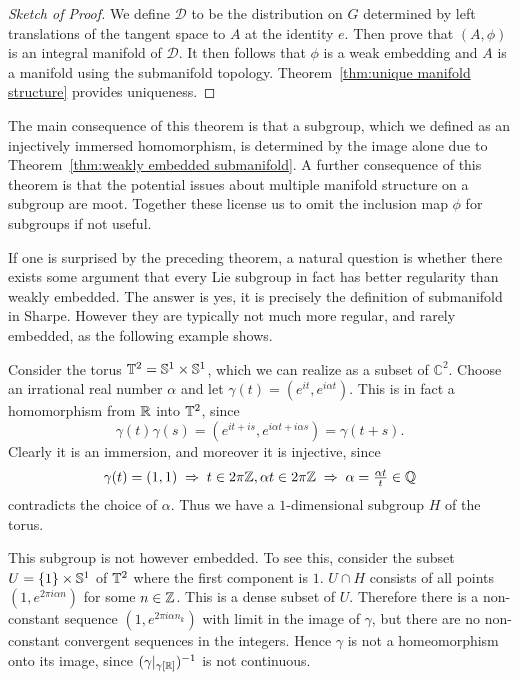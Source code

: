 \begin{proof}[Sketch of Proof]
We define $\mathcal{D}$ to be the distribution on $G$ determined by left translations of the tangent space to $A$ at the identity $e$. 
Then prove that $(A,\phi)$ is an integral manifold of $\mathcal{D}$. 
It then follows that $\phi$ is a weak embedding and $A$ is a manifold using the submanifold topology.
Theorem~\ref{thm:unique manifold structure} provides uniqueness.
\end{proof}

The main consequence of this theorem is that a subgroup, which we defined as an injectively immersed homomorphism, is determined by the image alone due to Theorem~\ref{thm:weakly embedded submanifold}.
A further consequence of this theorem is that the potential issues about multiple manifold structure on a subgroup are moot.
Together these license us to omit the inclusion map $\phi$ for subgroups if not useful.

If one is surprised by the preceding theorem, a natural question is whether there exists some argument that every Lie subgroup in fact has better regularity than weakly embedded.
The answer is yes, it is precisely the definition of submanifold in Sharpe.
However they are typically not much more regular, and rarely embedded, as the following example shows.

\begin{example}
\label{eg:dense subgroup in torus}
Consider the torus $\mathbb{T}^2 = \mathbb{S}^1 \times \mathbb{S}^1$, which we can realize as a subset of $\mathbb{C}^2$.
Choose an irrational real number $\alpha$ and let $\gamma(t) = (e^{it}, e^{i\alpha t})$.
This is in fact a homomorphism from $\mathbb{R}$ into $\mathbb{T}^2$, since
\[
\gamma(t)\gamma(s)
= (e^{it+is}, e^{i\alpha t+i\alpha s})
= \gamma(t+s).
\]
Clearly it is an immersion, and moreover it is injective, since
\[
\gamma(t) = (1,1)
\;\Rightarrow\;
t \in 2\pi\mathbb{Z}, \alpha t \in 2\pi\mathbb{Z}
\;\Rightarrow\;
\alpha = \tfrac{\alpha t}{t} \in \mathbb{Q}
\]
contradicts the choice of $\alpha$.
Thus we have a $1$-dimensional subgroup $H$ of the torus.

This subgroup is not however embedded.
To see this, consider the subset $U = \{1\}\times\mathbb{S}^1$ of $\mathbb{T}^2$ where the first component is $1$.
$U \cap H$ consists of all points $(1, e^{2\pi i\alpha n})$ for some $n \in \mathbb{Z}$.
This is a dense subset of $U$.
Therefore there is a non-constant sequence $(1, e^{2\pi i\alpha n_k})$ with limit in the image of $\gamma$, but there are no non-constant convergent sequences in the integers.
Hence $\gamma$ is not a homeomorphism onto its image, since $(\gamma|_{\gamma[\mathbb{R}]})^{-1}$ is not continuous.
\end{example}

